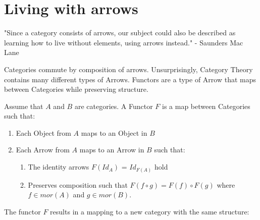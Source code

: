 \documentclass{article}
\begin{document}
\section{Living with arrows}
\begin{displayquote}
"Since a category consists of arrows, our subject could also be described
as learning how to live without elements, using arrows instead." - Saunders Mac Lane \cite{Saunders01}
\end{displayquote}
Categories commute by composition of arrows. Unsurprisingly, Category Theory contains many different types of Arrows. Functors are a type of Arrow that maps between Categories while preserving structure.
\begin{definition}
    Assume that $A$ and $B$ are categories. A Functor $F$ is a map between Categories such that:
    \begin{enumerate}
        \item Each Object from $A$ maps to an Object in $B$
        \item Each Arrow from $A$ maps to an Arrow in $B$ such that:
        \begin{enumerate}
            \item The identity arrows  $F(Id_A)$ = $Id_{F(A)}$ hold
            \item Preserves composition such that $F(f \circ g) = F(f)\circ F(g)$ where $f \in mor(A)$ and $g \in mor(B)$.
        \end{enumerate}
    \end{enumerate}
\end{definition}
\begin{center}
The functor $F$ results in a mapping to a new category with the same structure:
\end{center}
\end{document}
